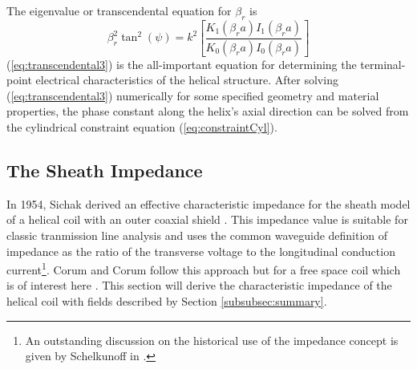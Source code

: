 The eigenvalue or transcendental equation for $\beta_{r}$ is 
\begin{equation}
	\beta_r^2 \tan^2\left(\psi\right) = k^2 \left[ \frac{K_1(\beta_r a)I_1(\beta_r a)}{K_0(\beta_r a)I_0(\beta_r a)}\right]
	\label{eq:transcendental3}
\end{equation}
(\ref{eq:transcendental3}) is the all-important equation for determining the terminal-point electrical characteristics of the helical structure. After solving (\ref{eq:transcendental3}) numerically for some specified geometry and material properties, the phase constant along the helix's axial direction can be solved from the cylindrical constraint equation (\ref{eq:constraintCyl}). 

\subsection{The Sheath Impedance}
In 1954, Sichak derived an effective characteristic impedance for the sheath model of a helical coil with an outer coaxial shield \cite{sichak1}. This impedance value is suitable for classic tranmission line analysis  and uses the common waveguide definition of impedance as the ratio of the transverse voltage to the longitudinal conduction current\footnote{An outstanding discussion on the historical use of the impedance concept is given by Schelkunoff in \cite{impedance}.}. Corum and Corum follow this approach but for a free space coil which is of interest here \cite{corum1}. This section will derive the characteristic impedance of the helical coil with fields described by Section \ref{subsubsec:summary}.
